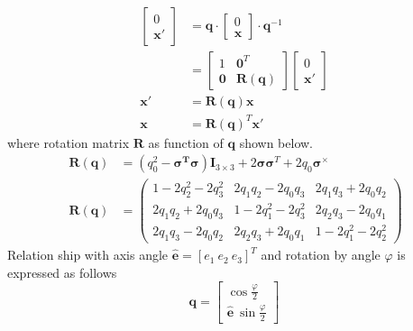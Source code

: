 \begin{equation*}
\begin{aligned}
\begin{bmatrix}
0\\
\mathbf{x} '
\end{bmatrix} & =\mathbf{q} \cdot \begin{bmatrix}
0\\
\mathbf{x}
\end{bmatrix} \cdot \mathbf{q}^{-1}\\
 & =\begin{bmatrix}
1 & \mathbf{0}^{T}\\
\mathbf{0} & \mathbf{R}(\mathbf{q})
\end{bmatrix}\begin{bmatrix}
0\\
\mathbf{x} '
\end{bmatrix}\\
\mathbf{x} ' & =\mathbf{R}(\mathbf{q})\mathbf{x}\\
\mathbf{x} & =\mathbf{R}(\mathbf{q})^{T}\mathbf{x} '
\end{aligned}
\end{equation*}
where rotation matrix $\displaystyle \mathbf{R}$ as function of $\displaystyle \mathbf{q}$ shown below.
\begin{equation}
\ \begin{aligned}
\mathbf{R}(\mathbf{q}) & =\left( q^{2}_{0} -\mathbf{\sigma ^{T} \sigma }\right)\mathbf{I}_{3\times 3} +2\mathbf{\sigma \sigma }^{T} +2q_{0}\mathbf{\sigma }^{\times }\\
\mathbf{R}(\mathbf{q}) & =\begin{pmatrix}
1-2q^{2}_{2} -2q^{2}_{3} & 2q_{1} q_{2} -2q_{0} q_{3} & 2q_{1} q_{3} +2q_{0} q_{2}\\
2q_{1} q_{2} +2q_{0} q_{3} & 1-2q^{2}_{1} -2q^{2}_{3} & 2q_{2} q_{3} -2q_{0} q_{1}\\
2q_{1} q_{3} -2q_{0} q_{2} & 2q_{2} q_{3} +2q_{0} q_{1} & 1-2q^{2}_{1} -2q^{2}_{2}
\end{pmatrix}
\end{aligned}
\end{equation}
Relation ship with axis angle $\displaystyle \hat{\mathbf{e}} =[ e_{1} \ e_{2} \ e_{3}]^{T}$ and rotation by angle $\displaystyle \varphi $ is expressed as follows
\begin{equation}
\label{eqn:axisAngle}
\mathbf{q} =\begin{bmatrix}
\cos\frac{\varphi }{2}\\
\hat{\mathbf{e}} \ \sin\frac{\varphi }{2}
\end{bmatrix}
\end{equation}
